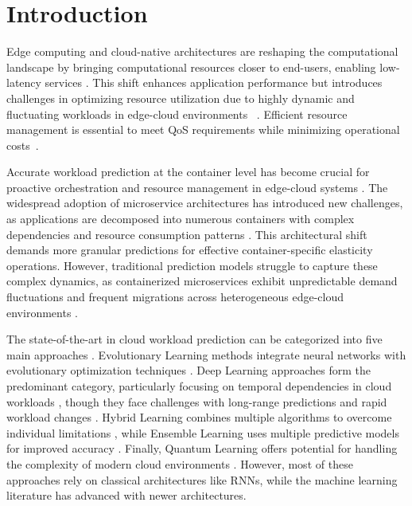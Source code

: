 \section{Introduction}
\label{sec:ch3_introduction}

Edge computing and cloud-native architectures are reshaping the computational landscape by bringing computational resources closer to end-users, enabling low-latency services \cite{shang2023online}. This shift enhances application performance but introduces challenges in optimizing resource utilization due to highly dynamic and fluctuating workloads in edge-cloud environments ~\cite{10229064, 8258257}. Efficient resource management is essential to meet \ac{QoS} requirements while minimizing operational costs~\cite{8258257}.

Accurate workload prediction at the container level has become crucial for proactive orchestration and resource management in edge-cloud systems \cite{9068614}. The widespread adoption of microservice architectures has introduced new challenges, as applications are decomposed into numerous containers with complex dependencies and resource consumption patterns \cite{10029931}. This architectural shift demands more granular predictions for effective container-specific elasticity operations. However, traditional prediction models struggle to capture these complex dynamics, as containerized microservices exhibit unpredictable demand fluctuations and frequent migrations across heterogeneous edge-cloud environments \cite{ouyang2023dynamic, benidis2022deep}.

The state-of-the-art in cloud workload prediction can be categorized into five main approaches \cite{kumar2018workload, tang2019large}. Evolutionary Learning methods integrate neural networks with evolutionary optimization techniques \cite{kumar2021self}. Deep Learning approaches form the predominant category, particularly focusing on temporal dependencies in cloud workloads \cite{zhang2018efficient, zhang2017resource}, though they face challenges with long-range predictions and rapid workload changes \cite{hochreiter1998vanishing}. Hybrid Learning combines multiple algorithms to overcome individual limitations \cite{kardani2020adrl, karim2021bhyprec}, while Ensemble Learning uses multiple predictive models for improved accuracy \cite{singh2014ensemble, iqbal2019adaptive}. Finally, Quantum Learning offers potential for handling the complexity of modern cloud environments \cite{singh2021quantum}. However, most of these approaches rely on classical architectures like \acp{RNN}, while the machine learning literature has advanced with newer architectures.

